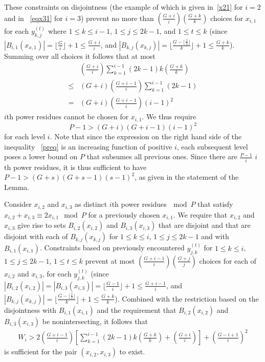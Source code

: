 These  constraints on disjointness (the example of which is given
in~\eqref{x21} for $i=2$ and in ~\eqref{eqx31} for $i=3$) prevent
no more than $(\frac{G+i}{i})(\frac{G+k}{k})$ choices for
$x_{i,1}$  for each $y_{k,j}^{(t)}$ where $1 \leq k \leq i-1$, $1
\leq j \leq 2k-1$, and $1 \leq t \leq k$ (since
$|B_{i,1}(x_{x,1})|=\lfloor \frac{G}{i} \rfloor+1 \leq
\frac{G+i}{i}$, and $|B_{k,j}(x_{k,j})|=\lfloor \frac{G-\lfloor
\frac{j}{2}\rfloor}{k} \rfloor+1 \leq \frac{G+k}{k}$). Summing
over all choices it follows that at most
\begin{equation}\begin{array}{lll}{}& \left(\frac{G+i}{i}\right) \sum_{k=1}^{i-1}
(2k-1)k\left(\frac{G+k}{k}\right)\\\leq&
(G+i)\left(\frac{G+i-1}{i}\right) \sum_{k=1}^{i-1}
(2k-1)\\=&(G+i)\left(\frac{G+i-1}{i}\right)(i-1)^2
\end{array}\end{equation} $i$th power residues cannot be chosen for
$x_{i,1}$. We thus require
\begin{equation}\label{preq}
P-1 > (G+i)(G+i-1)(i-1)^2
\end{equation}
for each level $i$. Note that since the expression on the right
hand side of the inequality ~\eqref{preq} is an increasing
function of positive $i$, each subsequent level poses a lower
bound on $P$ that subsumes all previous ones. Since there are
$\frac{P-1}{i}$ $i$th power residues, it is thus sufficient to
have $P-1
> (G+s)(G+s-1)(s-1)^2$, as given in the statement of the Lemma.

Consider $x_{i,2}$ and $x_{i,3}$ as distinct $i$th power
residues$~\mod P$ that satisfy $x_{i,2}+ x_{i,3} \equiv 2x_{i,1}
\mod P$ for a previously chosen $x_{i,1}$. We require that
 $x_{i,2}$ and $x_{i,3}$ give rise to sets $B_{i,2}(x_{i,2})$ and
$B_{i,3}(x_{i,3})$ that are disjoint and that are disjoint with
each of $B_{k,j}(x_{k,j})$ for $1\leq k \leq i$, $1\leq j \leq
2k-1$ and with $B_{i,1}(x_{i,1})$. Constraints based on previously
encountered $y_{j,k}^{(t)}$ for $1\leq k \leq i$, $1\leq j \leq
2k-1$, $1 \leq t \leq k$ prevent at most
$(\frac{G+i-1}{i})(\frac{G+j}{j})$ choices for each of $x_{i,2}$
and $x_{i,3}$, for each $y_{j,k}^{(t)}$ (since
$|B_{i,2}(x_{i,2})|=|B_{i,3}(x_{i,3})|= \lfloor \frac{G-1}{i}
\rfloor+1 \leq \frac{G+i-1}{i}$, and $|B_{k,j}(x_{k,j})|=\lfloor
\frac{G-\lfloor \frac{j}{2}\rfloor}{k} \rfloor+1 \leq
\frac{G+k}{k}$). Combined with the restriction based on the
disjointness with $B_{i,1}(x_{i,1})$ and the requirement that
$B_{i,2}(x_{i,2})$ and $B_{i,3}(x_{i,3})$ be nonintersecting, it
follows that
\begin{equation}\begin{array}{lll} W_i>
2\left(\frac{G+i-1}{i}\right) \left[\sum_{k=1}^{i-1}
(2k-1)k(\frac{G+k}{k})+\left( \frac{G+i}{i}\right)\right]+\left(
\frac{G-i+1}{i}\right)^2
\end{array}\end{equation}
is sufficient for the pair $(x_{i,2},x_{i,3})$ to exist.

